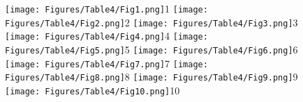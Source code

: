 \documentclass[a4paper, 11pt, oneside, german]{article}
\begin{document}
\clearpage
{}
\cfoot{\thepage}
\begin{figure}[p]
\texttt{[image: Figures/Table4/Fig1.png]}\tiny 1
\texttt{[image: Figures/Table4/Fig2.png]}\tiny 2
\texttt{[image: Figures/Table4/Fig3.png]}\tiny 3
\texttt{[image: Figures/Table4/Fig4.png]}\tiny 4
\texttt{[image: Figures/Table4/Fig5.png]}\tiny 5
\texttt{[image: Figures/Table4/Fig6.png]}\tiny 6
\texttt{[image: Figures/Table4/Fig7.png]}\tiny 7
\texttt{[image: Figures/Table4/Fig8.png]}\tiny 8
\texttt{[image: Figures/Table4/Fig9.png]}\tiny 9
\texttt{[image: Figures/Table4/Fig10.png]}\tiny 10
\end{figure}
\clearpage
\end{document}
